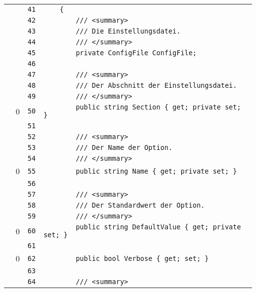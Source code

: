 \documentclass[a4paper,10pt]{article}
\begin{document}
\begin{longtable}[l]{lrrl}
\cellcolor{gray} &  & \verb~41~ & \verb~    {~\\
\cellcolor{gray} &  & \verb~42~ & \verb~        /// <summary>~\\
\cellcolor{gray} &  & \verb~43~ & \verb~        /// Die Einstellungsdatei.~\\
\cellcolor{gray} &  & \verb~44~ & \verb~        /// </summary>~\\
\cellcolor{gray} &  & \verb~45~ & \verb~        private ConfigFile ConfigFile;~\\
\cellcolor{gray} &  & \verb~46~ & \verb~~\\
\cellcolor{gray} &  & \verb~47~ & \verb~        /// <summary>~\\
\cellcolor{gray} &  & \verb~48~ & \verb~        /// Der Abschnitt der Einstellungsdatei.~\\
\cellcolor{gray} &  & \verb~49~ & \verb~        /// </summary>~\\
\cellcolor{red} & 0 & \verb~50~ & \verb~        public string Section { get; private set; }~\\
\cellcolor{gray} &  & \verb~51~ & \verb~~\\
\cellcolor{gray} &  & \verb~52~ & \verb~        /// <summary>~\\
\cellcolor{gray} &  & \verb~53~ & \verb~        /// Der Name der Option.~\\
\cellcolor{gray} &  & \verb~54~ & \verb~        /// </summary>~\\
\cellcolor{red} & 0 & \verb~55~ & \verb~        public string Name { get; private set; }~\\
\cellcolor{gray} &  & \verb~56~ & \verb~~\\
\cellcolor{gray} &  & \verb~57~ & \verb~        /// <summary>~\\
\cellcolor{gray} &  & \verb~58~ & \verb~        /// Der Standardwert der Option.~\\
\cellcolor{gray} &  & \verb~59~ & \verb~        /// </summary>~\\
\cellcolor{red} & 0 & \verb~60~ & \verb~        public string DefaultValue { get; private set; }~\\
\cellcolor{gray} &  & \verb~61~ & \verb~~\\
\cellcolor{red} & 0 & \verb~62~ & \verb~        public bool Verbose { get; set; }~\\
\cellcolor{gray} &  & \verb~63~ & \verb~~\\
\cellcolor{gray} &  & \verb~64~ & \verb~        /// <summary>~\\

\end{longtable}
\end{document}
